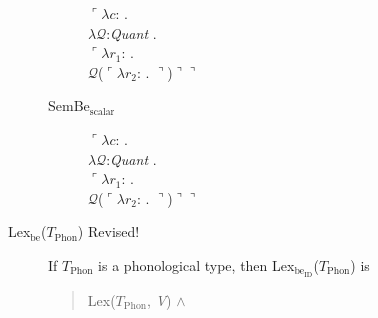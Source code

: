 \begin{description}
\begin{description}
          $\ulcorner\lambda c$: . \\
        \hspace*{1em}$\lambda\mathcal{Q}$:\textit{Quant} . \\
        \hspace*{2em} $\ulcorner\lambda r_1$:
. \\
\hspace*{3em} $\mathcal{Q}$($\ulcorner\lambda
r_2$:
. $\urcorner$)$\urcorner\urcorner$

\item[\textnormal{SemBe$_{\text{scalar}}$}] \mbox{}

  $\ulcorner\lambda c$: . \\
        \hspace*{1em}$\lambda\mathcal{Q}$:\textit{Quant} . \\
        \hspace*{2em} $\ulcorner\lambda r_1$:
. \\
\hspace*{3em} $\mathcal{Q}$($\ulcorner\lambda
r_2$:
. $\urcorner$)$\urcorner\urcorner$

\end{description}


\item[\textnormal{Lex$_{\mathrm{be}}$($T_{\mathrm{Phon}}$)} Revised!] \mbox{}

  If $T_{\mathrm{Phon}}$ is a phonological type, then
  Lex$_{\mathrm{be}_{\text{ID}}}$($T_{\mathrm{Phon}}$) is
\begin{quote}
  Lex($T_{\mathrm{Phon}}$,
\textit{V}) \d{$\wedge$}
\end{quote}


\end{description}
